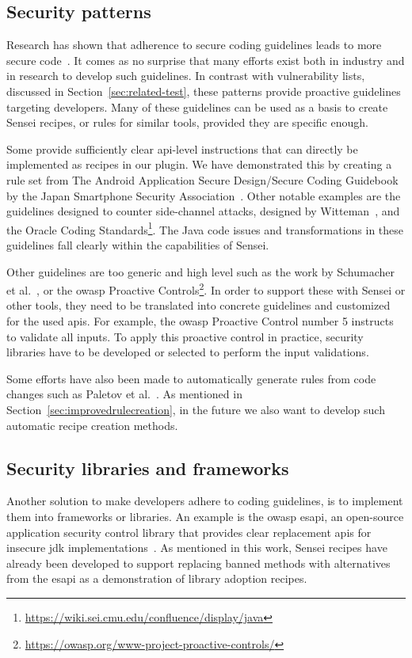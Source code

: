 \subsection{Security patterns}
Research has shown that adherence to secure coding guidelines leads to more secure code~\cite{lipfordimpact}.
It comes as no surprise that many efforts exist both in industry and in research to develop such guidelines.
In contrast with vulnerability lists, discussed in Section~\ref{sec:related-test}, these patterns provide proactive guidelines targeting developers.
Many of these guidelines can be used as a basis to create Sensei recipes, or rules for similar tools, provided they are specific enough.

Some provide sufficiently clear \gls{api}-level instructions that can directly be implemented as recipes in our plugin.
We have demonstrated this by creating a rule set from The Android Application Secure Design/Secure Coding Guidebook by the Japan Smartphone Security Association~\cite{jssec}.
Other notable examples are the guidelines designed to counter side-channel attacks, designed by Witteman~\cite{witteman2008secure}, and the Oracle Coding Standards\footnote{\url{https://wiki.sei.cmu.edu/confluence/display/java}}.
The Java code issues and transformations in these guidelines fall clearly within the capabilities of Sensei.

Other  guidelines are too generic and high level such as the work by Schumacher et al.~\cite{schumacher2013security}, or the \gls{owasp} Proactive Controls\footnote{\url{https://owasp.org/www-project-proactive-controls/}}.
In order to support these with Sensei or other tools, they need to be translated into concrete guidelines and customized for the used \glspl{api}.
For example, the \gls{owasp} Proactive Control number 5 instructs to validate all inputs.
To apply this proactive control in practice, security libraries have to be developed or selected to perform the input validations.

Some efforts have also been made to automatically generate rules from code changes such as Paletov et al.~\cite{paletov2018inferring}.
As mentioned in Section~\ref{sec:improvedrulecreation}, in the future we also want to develop such automatic recipe creation methods.

\subsection{Security libraries and frameworks}
Another solution to make developers adhere to coding guidelines, is to implement them into frameworks or libraries.
An example is the \gls{owasp} \gls{esapi}, an open-source application security control library that provides clear replacement \glspl{api} for insecure \gls{jdk} implementations~\cite{ESAPI}.
As mentioned in this work, Sensei recipes have already been developed to support replacing banned methods with alternatives from the \gls{esapi} as a demonstration of library adoption recipes. 

